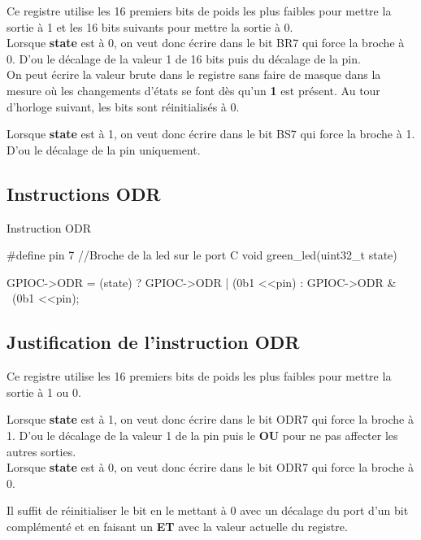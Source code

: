 \documentclass[12pt]{report}
\renewcommand{\bold}[1]{\textbf{#1}}
\begin{document}
Ce registre utilise les 16 premiers bits de poids les plus faibles pour mettre la sortie à 1 et 
les 16 bits suivants pour mettre la sortie à 0. \\

Lorsque \bold{state} est à 0, on veut donc écrire dans le bit BR7 qui force la broche à 0. 
D'ou le décalage de la valeur 1 de 16 bits puis du décalage de la pin. \\
On peut écrire la valeur brute dans le registre sans faire de masque dans la mesure où 
les changements d'états se font dès qu'un \bold{1} est présent. Au tour d'horloge suivant, les bits sont réinitialisés à 0.

Lorsque \bold{state} est à 1, on veut donc écrire dans le bit BS7 qui force la broche à 1. 
D'ou le décalage de la pin uniquement. \\



\subsection{Instructions ODR}

\begin{Cpp}{Instruction ODR}
  
  #define pin 7 //Broche de la led sur le port C
  void green_led(uint32_t state) {

    GPIOC->ODR = (state) ? GPIOC->ODR | (0b1 <<pin) : GPIOC->ODR & ~(0b1 <<pin);
     
  }
  

\end{Cpp}

\subsection{Justification de l'instruction ODR}

Ce registre utilise les 16 premiers bits de poids les plus faibles pour mettre la sortie à 1 ou 0.

Lorsque \bold{state} est à 1, on veut donc écrire dans le bit ODR7 qui force la broche à 1. D'ou le décalage de la valeur 1 de la pin puis le \bold{OU} pour ne pas affecter les autres sorties. \\


Lorsque \bold{state} est à 0, on veut donc écrire dans le bit ODR7 qui force la broche à 0. 

Il suffit de réinitialiser le bit en le mettant à 0 avec un décalage du port d'un bit complémenté et en faisant un \bold{ET}
avec la valeur actuelle du registre.
\end{document}
